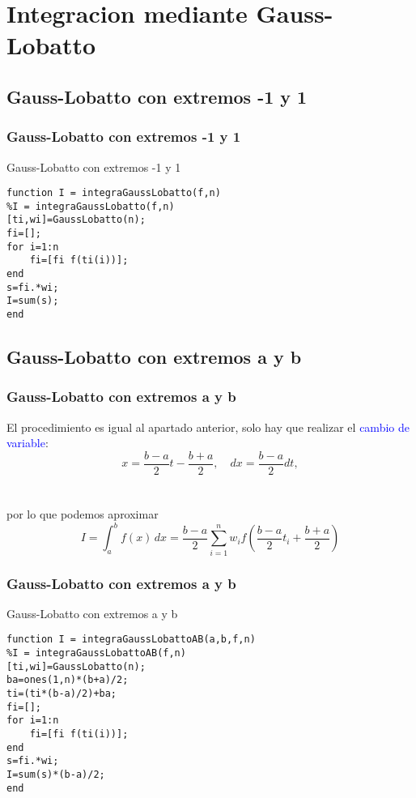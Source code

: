 \documentclass{beamer}
\begin{document}
\section{Integracion mediante Gauss-Lobatto}
\subsection{Gauss-Lobatto con extremos -1 y 1}
\begin{frame}[fragile] %
\frametitle{Gauss-Lobatto con extremos -1 y 1}
\begin{exampleblock}{Gauss-Lobatto con extremos -1 y 1}
\begin{verbatim}
function I = integraGaussLobatto(f,n)
%I = integraGaussLobatto(f,n)
[ti,wi]=GaussLobatto(n);
fi=[];
for i=1:n
    fi=[fi f(ti(i))];
end
s=fi.*wi;
I=sum(s);
end
\end{verbatim}
\end{exampleblock}
\end{frame}




\subsection{Gauss-Lobatto con extremos a y b}
\begin{frame}
\frametitle{Gauss-Lobatto con extremos a y b}
El procedimiento es igual al apartado anterior, solo hay que realizar el \textcolor{blue}{cambio de variable}:
\[x=\frac{b-a}{2}t-\frac{b+a}{2},\quad dx=\frac{b-a}{2}dt,\]
\\~\\
por lo que podemos aproximar
\[\displaystyle I=\int_{a}^{b} \! f(x)  \,dx = \frac{b-a}{2} \sum_{i=1}^{n}w_i f \left(\frac{b-a}{2}t_i + \frac{b+a}{2} \right)\]
\end{frame}


\begin{frame}[fragile] %
\frametitle{Gauss-Lobatto con extremos a y b}
\begin{exampleblock}{Gauss-Lobatto con extremos a y b}
\begin{verbatim}
function I = integraGaussLobattoAB(a,b,f,n)
%I = integraGaussLobattoAB(f,n)
[ti,wi]=GaussLobatto(n);
ba=ones(1,n)*(b+a)/2;
ti=(ti*(b-a)/2)+ba;
fi=[];
for i=1:n
    fi=[fi f(ti(i))];
end
s=fi.*wi;
I=sum(s)*(b-a)/2;
end\end{verbatim}
\end{exampleblock}
\end{frame}
\end{document}
